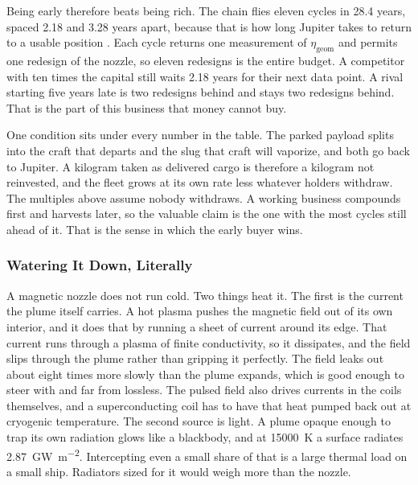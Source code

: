 \documentclass{article}
\begin{document}
Being early therefore beats being rich. The chain flies eleven cycles in 28.4 years, spaced 2.18 and 3.28 years apart, because that is how long Jupiter takes to return to a usable position \cite{Katz_aim_is_all_you_need_2025}. Each cycle returns one measurement of $\eta_{\mathrm{geom}}$ and permits one redesign of the nozzle, so eleven redesigns is the entire budget. A competitor with ten times the capital still waits 2.18 years for their next data point. A rival starting five years late is two redesigns behind and stays two redesigns behind. That is the part of this business that money cannot buy.

One condition sits under every number in the table. The parked payload splits into the craft that departs and the slug that craft will vaporize, and both go back to Jupiter. A kilogram taken as delivered cargo is therefore a kilogram not reinvested, and the fleet grows at its own rate less whatever holders withdraw. The multiples above assume nobody withdraws. A working business compounds first and harvests later, so the valuable claim is the one with the most cycles still ahead of it. That is the sense in which the early buyer wins.

\subsubsection{Watering It Down, Literally}\label{sec:watering_it_down}
A magnetic nozzle does not run cold. Two things heat it. The first is the current the plume itself carries. A hot plasma pushes the magnetic field out of its own interior, and it does that by running a sheet of current around its edge. That current runs through a plasma of finite conductivity, so it dissipates, and the field slips through the plume rather than gripping it perfectly. The field leaks out about eight times more slowly than the plume expands, which is good enough to steer with and far from lossless. The pulsed field also drives currents in the coils themselves, and a superconducting coil has to have that heat pumped back out at cryogenic temperature. The second source is light. A plume opaque enough to trap its own radiation glows like a blackbody, and at \SI{15000}{\kelvin} a surface radiates \SI{2.87}{\giga\watt\per\square\meter}. Intercepting even a small share of that is a large thermal load on a small ship. Radiators sized for it would weigh more than the nozzle.
\end{document}
